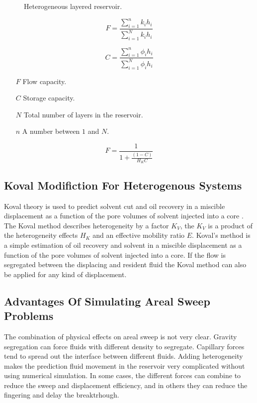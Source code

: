 \documentclass[barcolor=BrickRed,nocopyright,nolists]{asmejour}
\begin{document}
\begin{figure}[h]
	\centering\scalebox{1}{}
	\caption{Heterogeneous layered reservoir.}
	\label{heterogeneous}
\end{figure}

\begin{equation}
	F = \frac{\sum_{i=1}^{n}k_{i}h_{i}}{\sum_{i=1}^{N}k_{i}h_{i}}
\end{equation}

\begin{equation}
	C = \frac{\sum_{i=1}^{n}\phi_{i}h_{i}}{\sum_{i=1}^{N}\phi_{i}h_{i}}
\end{equation}

\begin{itemize}
	\item [$F$] Flow capacity.
	\item [$C$] Storage capacity.
	\item [$N$] Total number of layers in the reservoir.
	\item [$n$] A number between $1$ and $N$.
\end{itemize}

\begin{equation}
	F = \frac{1}{1 + \frac{(1-C)}{H_{K}C}}
\end{equation}

\subsection{Koval Modifiction For Heterogenous Systems}
Koval theory is used to predict solvent cut and oil recovery in a miscible displacement as a function of the pore volumes of solvent injected into a core \cite{salazar}.
The Koval method describes heterogeneity by a factor $K_{V}$, the $K_{V}$ is a product of the heterogeneity effects  $H_{K}$ and 
an effective mobility ratio $E$. Koval's method is a simple estimation of oil recovery and solvent in a miscible displacement as a
function of the pore volumes of solvent injected into a core. If the flow is segregated between the displacing and resident fluid
the Koval method can also be applied for any kind of displacement.

\subsection{Advantages Of Simulating Areal Sweep Problems}
The combination of physical effects on areal sweep is not very clear. Gravity segregation can force fluids with different density
to segregate. Capillary forces tend to spread out the interface between different fluids. Adding heterogeneity makes the prediction 
fluid movement in the reservoir very complicated without using numerical simulation. In some cases, the different forces can combine to 
reduce the sweep and displacement efficiency, and in others they can reduce the fingering and delay the breaktrhough.
\end{document}
